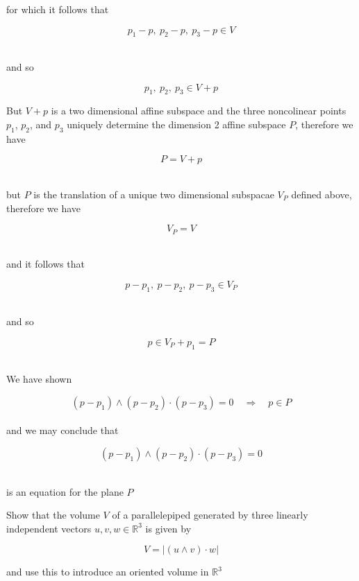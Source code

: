 \documentclass[12pt,letterpaper]{hmcpset}
\begin{document}
\begin{solution}
 for which it follows that

\[ p_1-p, \ p_2-p,\  p_3-p \in V\]\

and so 

\[ p_1, \ p_2,\  p_3 \in V +p\]

But $V+p$ is a two dimensional affine subspace and the three noncolinear points $p_1$, $p_2$, and $p_3$ uniquely determine the dimension 2 affine subspace $P$, therefore we have

\[ P = V+p\]\

but $P$ is the translation of a unique two dimensional subspacae $V_P$ defined above, therefore we have

\[ V_P = V\]\

and it follows that 

\[ p-p_1, \ p-p_2, \ p-p_3 \in V_P\]\

and so 

\[ p \in V_P + p_1 = P\]\


We have shown

\[ (p-p_1)\wedge(p-p_2)\cdot(p-p_3) = 0  \quad \Rightarrow \quad  p \in P\]\\

and we may conclude that 

\[ (p-p_1)\wedge(p-p_2)\cdot(p-p_3) = 0  \]\

is an equation for the plane $P$





\end{solution}




\newpage

\begin{problem}
Show that the volume $V$ of a parallelepiped generated by three linearly independent vectors $u,v,w \in \mathbb{R}^3$ is given by 

\begin{equation*}
V = \vert (u\wedge v)\cdot w \vert
\end{equation*}

and use this to introduce an oriented volume in $\mathbb{R}^3$

\end{problem}
\end{document}
